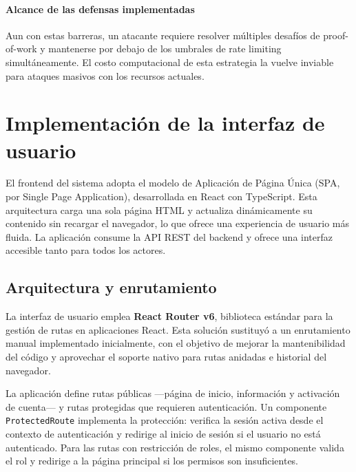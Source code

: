 \paragraph{Alcance de las defensas implementadas}

Aun con estas barreras, un atacante requiere resolver múltiples desafíos de proof-of-work y mantenerse por debajo de los umbrales de rate limiting simultáneamente. 
El costo computacional de esta estrategia la vuelve inviable para ataques masivos con los recursos actuales.



















\section{Implementación de la interfaz de usuario}
\label{section:frontend}

El frontend del sistema adopta el modelo de Aplicación de Página Única (\gls{SPA}, por Single Page Application), desarrollada en React con TypeScript. 
Esta arquitectura carga una sola página HTML y actualiza dinámicamente su contenido sin recargar el navegador, lo que ofrece una experiencia de usuario más fluida. 
La aplicación consume la API REST del backend y ofrece una interfaz accesible tanto para todos los actores.

\subsection{Arquitectura y enrutamiento}

La interfaz de usuario emplea \textbf{React Router v6}, biblioteca estándar para la gestión de rutas en aplicaciones React.
Esta solución sustituyó a un enrutamiento manual implementado inicialmente, con el objetivo de mejorar la mantenibilidad del código y aprovechar el soporte nativo para rutas anidadas e historial del navegador.

La aplicación define rutas públicas —página de inicio, información y activación de cuenta— y rutas protegidas que requieren autenticación. 
Un componente \texttt{ProtectedRoute} implementa la protección: verifica la sesión activa desde el contexto de autenticación y redirige al inicio de sesión si el usuario no está autenticado.
Para las rutas con restricción de roles, el mismo componente valida el rol y redirige a la página principal si los permisos son insuficientes.

